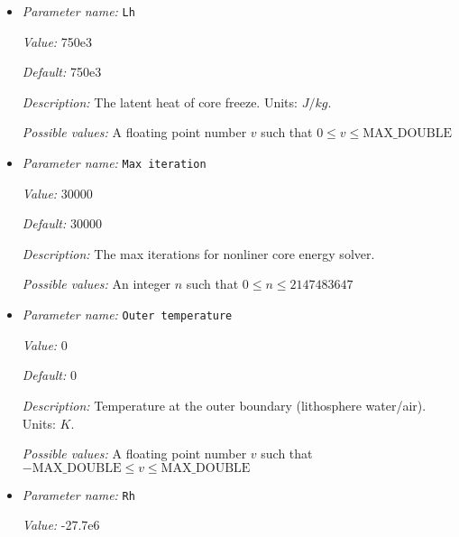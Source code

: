 \begin{itemize}
{\it Possible values:} A floating point number $v$ such that $0 \leq v \leq \text{MAX\_DOUBLE}$
\item {\it Parameter name:} {\tt Lh}
\label{parameters:Boundary temperature model/Dynamic core/Lh}
\label{parameters:Boundary_20temperature_20model/Dynamic_20core/Lh}


{\it Value:} 750e3


{\it Default:} 750e3


{\it Description:} The latent heat of core freeze. Units: $J/kg$.


{\it Possible values:} A floating point number $v$ such that $0 \leq v \leq \text{MAX\_DOUBLE}$
\item {\it Parameter name:} {\tt Max iteration}
\label{parameters:Boundary temperature model/Dynamic core/Max iteration}
\label{parameters:Boundary_20temperature_20model/Dynamic_20core/Max_20iteration}


{\it Value:} 30000


{\it Default:} 30000


{\it Description:} The max iterations for nonliner core energy solver.


{\it Possible values:} An integer $n$ such that $0\leq n \leq 2147483647$
\item {\it Parameter name:} {\tt Outer temperature}
\label{parameters:Boundary temperature model/Dynamic core/Outer temperature}
\label{parameters:Boundary_20temperature_20model/Dynamic_20core/Outer_20temperature}


{\it Value:} 0


{\it Default:} 0


{\it Description:} Temperature at the outer boundary (lithosphere water/air). Units: $K$.


{\it Possible values:} A floating point number $v$ such that $-\text{MAX\_DOUBLE} \leq v \leq \text{MAX\_DOUBLE}$
\item {\it Parameter name:} {\tt Rh}
\label{parameters:Boundary temperature model/Dynamic core/Rh}
\label{parameters:Boundary_20temperature_20model/Dynamic_20core/Rh}


{\it Value:} -27.7e6



\end{itemize}
